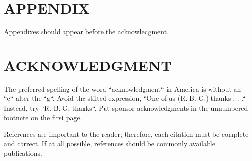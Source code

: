 \documentclass[letterpaper, 10 pt, conference]{ieeeconf}
\begin{document}
\section*{APPENDIX}

Appendixes should appear before the acknowledgment.

\section*{ACKNOWLEDGMENT}

The preferred spelling of the word ``acknowledgment`` in America is without an ``e`` after the ``g``. Avoid the stilted expression, ``One of us (R. B. G.) thanks . . .``  Instead, try ``R. B. G. thanks``. Put sponsor acknowledgments in the unnumbered footnote on the first page.




References are important to the reader; therefore, each citation must be complete and correct. If at all possible, references should be commonly available publications.
\end{document}
